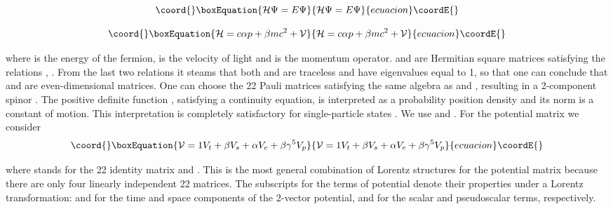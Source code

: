 \documentclass[a4paper,12pt,titlepage]{article}
\begin{document}
\begin{equation}\coord{}\boxEquation{
\mathcal{H}\Psi =E\Psi  \label{eq1}
}{
\mathcal{H}\Psi =E\Psi  }{ecuacion}\coordE{}\end{equation}

\begin{equation}\coord{}\boxEquation{
\mathcal{H}=c\alpha p+\beta mc^{2}+\mathcal{V}  \label{eq1a}
}{
\mathcal{H}=c\alpha p+\beta mc^{2}+\mathcal{V}  }{ecuacion}\coordE{}\end{equation}

\noindent where \coordHE{} is the energy of the fermion, \coordHE{} is the velocity of
light and \coordHE{} is the momentum operator. \myHighlight{$\alpha $}\coordHE{} and \myHighlight{$\beta $}\coordHE{} are Hermitian
square matrices satisfying the relations \coordHE{}, \coordHE{}. From the last two relations it steams
that both \myHighlight{$\alpha $}\coordHE{} and \myHighlight{$\beta $}\coordHE{} are traceless and have eigenvalues equal to
\myHighlight{$-$}\coordHE{}1, so that one can conclude that \myHighlight{$\alpha $}\coordHE{} and \myHighlight{$\beta $}\coordHE{} are
even-dimensional matrices. One can choose the 2\myHighlight{$\times $}\coordHE{}2 Pauli matrices
satisfying the same algebra as \myHighlight{$\alpha $}\coordHE{} and \myHighlight{$\beta $}\coordHE{}, resulting in a
2-component spinor \myHighlight{$\Psi $}\coordHE{}. The positive definite function \coordHE{}, satisfying a continuity equation, is interpreted as a
probability position density and its norm is a constant of motion. This
interpretation is completely satisfactory for single-particle states \cite
{tha}. We use \coordHE{} and \coordHE{}. For the
potential matrix we consider
\begin{equation}\coord{}\boxEquation{
\mathcal{V}=1V_{t}+\beta V_{s}+\alpha V_{e}+\beta \gamma ^{5}V_{p}
\label{eq2}
}{
\mathcal{V}=1V_{t}+\beta V_{s}+\alpha V_{e}+\beta \gamma ^{5}V_{p}
}{ecuacion}\coordE{}\end{equation}

\noindent where \coordHE{} stands for the 2\myHighlight{$\times $}\coordHE{}2 identity matrix and \coordHE{}. This is the most general combination of Lorentz
structures for the potential matrix because there are only four linearly
independent 2\myHighlight{$\times $}\coordHE{}2 matrices. The subscripts for the terms of potential
denote their properties under a Lorentz transformation: \coordHE{} and \coordHE{} for the
time and space components of the 2-vector potential, \coordHE{} and \coordHE{} for the
scalar and pseudoscalar terms, respectively.
\end{document}
